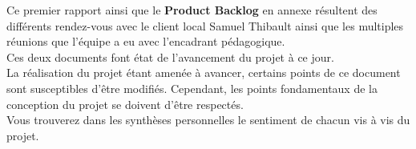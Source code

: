Ce premier rapport ainsi que le \textbf{Product Backlog} en annexe résultent des différents rendez-vous avec le client local Samuel Thibault ainsi que les multiples réunions que l'équipe a eu avec l'encadrant pédagogique.\\
Ces deux documents font état de l'avancement du projet à ce jour.\\

La réalisation du projet étant amenée à avancer, certains points de ce document sont susceptibles d'être modifiés. Cependant, les points fondamentaux de la conception du projet se doivent d'être respectés.\\

Vous trouverez dans les synthèses personnelles le sentiment de chacun vis à vis du projet.

